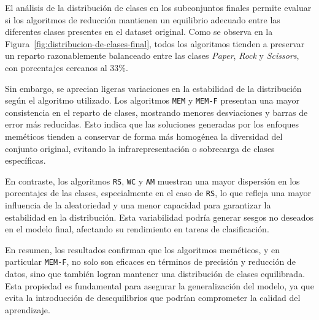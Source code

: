 El análisis de la distribución de clases en los subconjuntos finales permite evaluar si los algoritmos de reducción mantienen
un equilibrio adecuado entre las diferentes clases presentes en el dataset original.
Como se observa en la Figura~\ref{fig:distribucion-de-clases-final}, todos los algoritmos tienden a preservar un reparto
razonablemente balanceado entre las clases \textit{Paper}, \textit{Rock} y \textit{Scissors}, con porcentajes cercanos al 33\%.

Sin embargo, se aprecian ligeras variaciones en la estabilidad de la distribución según el algoritmo utilizado.
Los algoritmos \texttt{MEM} y \texttt{MEM-F} presentan una mayor consistencia en el reparto de clases,
mostrando menores desviaciones y barras de error más reducidas.
Esto indica que las soluciones generadas por los enfoques meméticos tienden a conservar de forma más homogénea la diversidad del conjunto original,
evitando la infrarepresentación o sobrecarga de clases específicas.

En contraste, los algoritmos \texttt{RS}, \texttt{WC} y \texttt{AM} muestran una mayor dispersión en los porcentajes de las clases,
especialmente en el caso de \texttt{RS}, lo que refleja una mayor influencia de la aleatoriedad y una menor capacidad para garantizar la estabilidad en la distribución.
Esta variabilidad podría generar sesgos no deseados en el modelo final, afectando su rendimiento en tareas de clasificación.

En resumen, los resultados confirman que los algoritmos meméticos, y en particular \texttt{MEM-F},
no solo son eficaces en términos de precisión y reducción de datos, sino que también logran mantener una distribución de clases equilibrada.
Esta propiedad es fundamental para asegurar la generalización del modelo, ya que evita la introducción de desequilibrios que podrían comprometer la calidad del aprendizaje.

